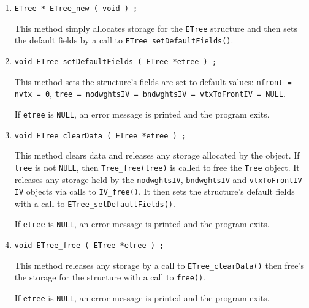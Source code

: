 \begin{enumerate}
\item
\begin{verbatim}
ETree * ETree_new ( void ) ;
\end{verbatim}
This method simply allocates storage for the {\tt ETree} structure 
and then sets the default fields by a call to 
{\tt ETree\_setDefaultFields()}.
\item
\begin{verbatim}
void ETree_setDefaultFields ( ETree *etree ) ;
\end{verbatim}
This method sets the structure's fields are set to default values:
{\tt nfront = nvtx = 0}, {\tt tree = nodwghtsIV = bndwghtsIV =
vtxToFrontIV = NULL}.
\par {}
If {\tt etree} is {\tt NULL},
an error message is printed and the program exits.
\item
\begin{verbatim}
void ETree_clearData ( ETree *etree ) ;
\end{verbatim}
This method clears data and releases any storage allocated by the
object.
If {\tt tree} is not {\tt NULL}, 
then {\tt Tree\_free(tree)} is called to free the {\tt Tree}
object.
It releases any storage held by the 
{\tt nodwghtsIV}, {\tt bndwghtsIV} 
and {\tt vtxToFrontIV} {\tt IV} objects
via calls to {\tt IV\_free()}.
It then sets the structure's default fields 
with a call to {\tt ETree\_setDefaultFields()}.
\par {}
If {\tt etree} is {\tt NULL},
an error message is printed and the program exits.
\item
\begin{verbatim}
void ETree_free ( ETree *etree ) ;
\end{verbatim}
This method releases any storage by a call to 
{\tt ETree\_clearData()} then free's the storage for the 
structure with a call to {\tt free()}.
\par {}
If {\tt etree} is {\tt NULL},
an error message is printed and the program exits.
\end{enumerate}
\par
